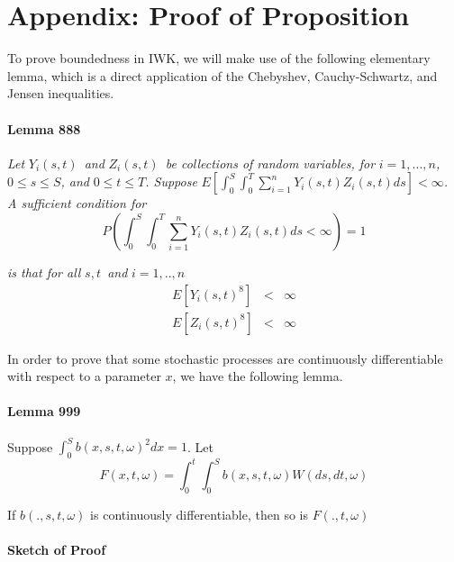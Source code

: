 \documentclass{article}
\begin{document}
\section{Appendix: Proof of Proposition}

To prove boundedness in IWK, we will make use of the following elementary
lemma, which is a direct application of the Chebyshev, Cauchy-Schwartz, and
Jensen inequalities.

\paragraph{Lemma 888}

\textit{Let }$Y_{i}(s,t)$\textit{\ and }$Z_{i}(s,t)$\textit{\ be collections
of random variables, for }$i=1,...,n$\textit{, }$0\leq s\leq S$\textit{, and 
}$0\leq t\leq T$\textit{. Suppose }$E[\int_{0}^{S}\int_{0}^{T}%
\sum_{i=1}^{n}Y_{i}(s,t)Z_{i}(s,t)ds]<\infty $\textit{. A sufficient
condition for }%
\begin{equation*}
P(\int_{0}^{S}\int_{0}^{T}\sum_{i=1}^{n}Y_{i}(s,t)Z_{i}(s,t)ds<\infty )=1
\end{equation*}

\textit{is that for all }$s,t$\textit{\ and }$i=1,..,n$%
\begin{eqnarray*}
E[Y_{i}(s,t)^{8}] &<&\infty \\
E[Z_{i}(s,t)^{8}] &<&\infty
\end{eqnarray*}

In order to prove that some stochastic processes are continuously
differentiable with respect to a parameter $x$, we have the following lemma.

\bigskip

\paragraph{Lemma 999}

Suppose $\int_{0}^{S}b(x,s,t,\omega )^{2}dx=1$. Let 
\begin{equation*}
F(x,t,\omega )=\int_{0}^{t}\int_{0}^{S}b(x,s,t,\omega )W(ds,dt,\omega )
\end{equation*}

If $b(.,s,t,\omega )$ is continuously differentiable, then so is $%
F(.,t,\omega )$

\paragraph{Sketch of Proof}
\end{document}
